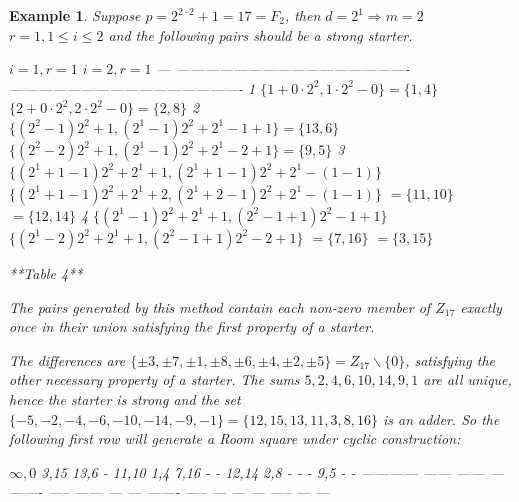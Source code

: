 \documentclass[
  11pt,
  a4paper]{book}
\newtheorem{example}{Example}
\begin{document}
\begin{example}
Suppose $p = 2^{2\cdot 2} + 1 = 17 = F_2$, then
$d = 2^1 \Rightarrow m = 2$
$r = 1, 1 \leq i \leq 2$ and the following pairs should be a strong
starter.

      $i=1,r=1$                                         $i=2,r=1$
  --- ------------------------------------------------- -------------------------------------------------
  1   $\{1+0 \cdot 2^2,1 \cdot 2^2 - 0\} = \{1,4\}$     $\{2+0 \cdot 2^2,2 \cdot 2^2 -0\} = \{2,8\}$
  2   $\{(2^2-1)2^2+1,(2^1-1)2^2+2^1-1+1\}=\{13,6\}$    $\{(2^2-2)2^2+1,(2^1-1)2^2+2^1-2+1\}=\{9,5\}$
  3   $\{(2^1+1-1)2^2+2^1+1,(2^1+1-1)2^2+2^1-(1-1)\}$   $\{(2^1+1-1)2^2+2^1+2,(2^1+2-1)2^2+2^1-(1-1)\}$
      $=\{11,10\}$                                      $=\{12,14\}$
  4   $\{(2^1-1)2^2+2^1+1,(2^2-1+1)2^2-1+1\}$           $\{(2^1-2)2^2+2^1+1,(2^2-1+1)2^2-2+1\}$
      $=\{7,16\}$                                       $=\{3,15\}$

**Table 4**

The pairs generated by this method contain each non-zero
member of $Z_{17}$ exactly once in their union satisfying
the first property of a starter.

The differences are
$\{\pm 3, \pm 7, \pm 1, \pm 8, \pm 6, \pm 4, \pm 2, \pm 5\} = Z_{17} \backslash \{0\}$,
satisfying the other necessary property of a starter.
The sums $5, 2, 4, 6, 10, 14, 9, 1$ are all unique, hence
the starter is strong and the set
$\{-5, -2, -4, -6, -10, -14, -9, -1\} = \{12, 15, 13, 11, 3, 8, 16\}$
is an adder. So the following first row will generate a
Room square under cyclic construction:

   $\infty,0$   3,15   13,6   -   11,10   1,4   7,16   -   -   12,14   2,8   -   -   -   9,5   -   -
  ------------ ------ ------ --- ------- ----- ------ --- --- ------- ----- --- --- --- ----- --- ---
\end{example}
\end{document}
